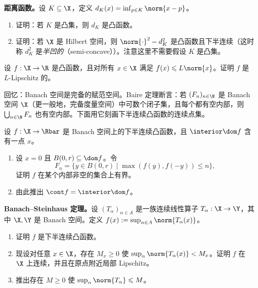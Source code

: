 
\begin{exercise}[原讲义 B.2 练习 13]
\label{exo:B2-13}
\textbf{距离函数。}设 $K\subseteq\X$，定义 $d_K(x)=\inf_{p\in K}\norm{x-p}$。
\begin{enumerate}[label=\arabic*.]
  \item 证明：若 $K$ 是凸集，则 $d_K$ 是凸函数。
  \item 证明：若 $\X$ 是 Hilbert 空间，则 $\norm{\cdot}^2-d_K^2$ 是凸函数且下半连续（这时称 $d_K^2$ 是\emph{半凹的}（semi-concave））。注意这里不需要假设 $K$ 是凸集。
\end{enumerate}
\end{exercise}

\begin{exercise}[原讲义 B.2 练习 14]
\label{exo:B2-14}
设 $f:\X\to\R$ 是凸函数，且对所有 $x\in\X$ 满足 $f(x)\leqslant L\norm{x}$。证明 $f$ 是 $L$-Lipschitz 的。
\end{exercise}

回忆：Banach 空间是完备的赋范空间。Baire 定理断言：若 $(F_n)_{n\in\N}$ 是 Banach 空间 $\X$（更一般地，完备度量空间）中可数个闭子集，且每个都有空内部，则 $\bigcup_{n\in\N}F_n$ 也有空内部。下面用它刻画下半连续凸函数的连续点集。

\begin{exercise}[原讲义 B.2 练习 15]
\label{exo:B2-15}
设 $f:\X\to\Rbar$ 是 Banach 空间上的下半连续凸函数，且 $\interior\dom f$ 含有一点 $x$。
\begin{enumerate}[label=\arabic*.]
  \item 设 $x=0$ 且 $B(0,r)\subseteq\dom f$。令
  \[
    F_n=\{y\in B(0,r) \mid \max(f(y),f(-y))\leqslant n\},
  \]
  证明 $f$ 在某个内部非空的集合上有界。
  \item 由此推出 $\cont f=\interior\dom f$。
\end{enumerate}
\end{exercise}

\begin{exercise}[原讲义 B.2 练习 16]
\label{exo:B2-16}
\textbf{Banach--Steinhaus 定理。}设 $(T_\alpha)_{\alpha\in A}$ 是一族连续线性算子 $T_\alpha:\X\to\Y$，其中 $\X,\Y$ 是 Banach 空间。定义 $f(x):=\sup_{\alpha\in A}\norm{T_\alpha(x)}$。
\begin{enumerate}[label=\arabic*.]
  \item 证明 $f$ 是下半连续凸函数。
  \item 现设对任意 $x\in\X$，存在 $M_x\geqslant0$ 使 $\sup_\alpha\norm{T_\alpha(x)}<M_x$。证明 $f$ 在 $\X$ 上连续，并且在原点附近局部 Lipschitz。
  \item 推出存在 $M\geqslant0$ 使 $\sup_\alpha\norm{T_\alpha}\leqslant M$。
\end{enumerate}
\end{exercise}

